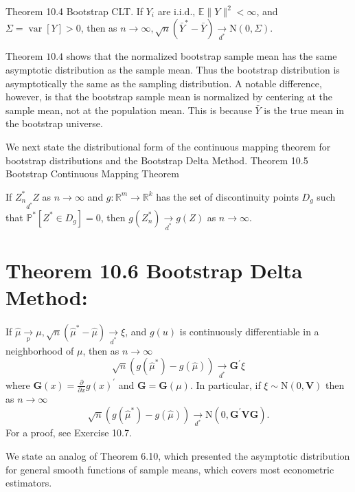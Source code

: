 \documentclass[10pt]{article}
\begin{document}
Theorem 10.4 Bootstrap CLT. If $Y_{i}$ are i.i.d., $\mathbb{E}\|Y\|^{2}<\infty$, and $\Sigma=\operatorname{var}[Y]>0$, then as $n \rightarrow \infty, \sqrt{n}\left(\bar{Y}^{*}-\bar{Y}\right) \underset{d^{*}}{\longrightarrow} \mathrm{N}(0, \Sigma)$.

Theorem $10.4$ shows that the normalized bootstrap sample mean has the same asymptotic distribution as the sample mean. Thus the bootstrap distribution is asymptotically the same as the sampling distribution. A notable difference, however, is that the bootstrap sample mean is normalized by centering at the sample mean, not at the population mean. This is because $\bar{Y}$ is the true mean in the bootstrap universe.

We next state the distributional form of the continuous mapping theorem for bootstrap distributions and the Bootstrap Delta Method. Theorem 10.5 Bootstrap Continuous Mapping Theorem

If $Z_{n}^{*} \underset{d^{*}}{ } Z$ as $n \rightarrow \infty$ and $g: \mathbb{R}^{m} \rightarrow \mathbb{R}^{k}$ has the set of discontinuity points $D_{g}$ such that $\mathbb{P}^{*}\left[Z^{*} \in D_{g}\right]=0$, then $g\left(Z_{n}^{*}\right) \underset{d^{*}}{\rightarrow} g(Z)$ as $n \rightarrow \infty$.

\section{Theorem 10.6 Bootstrap Delta Method:}
If $\widehat{\mu} \underset{p}{\longrightarrow} \mu, \sqrt{n}\left(\widehat{\mu}^{*}-\widehat{\mu}\right) \underset{d^{*}}{\longrightarrow} \xi$, and $g(u)$ is continuously differentiable in a neighborhood of $\mu$, then as $n \rightarrow \infty$
$$
\sqrt{n}\left(g\left(\widehat{\mu}^{*}\right)-g(\widehat{\mu})\right) \underset{d^{*}}{\longrightarrow} \boldsymbol{G}^{\prime} \xi
$$
where $\boldsymbol{G}(x)=\frac{\partial}{\partial x} g(x)^{\prime}$ and $\boldsymbol{G}=\boldsymbol{G}(\mu)$. In particular, if $\xi \sim \mathrm{N}(0, \boldsymbol{V})$ then as $n \rightarrow \infty$
$$
\sqrt{n}\left(g\left(\widehat{\mu}^{*}\right)-g(\widehat{\mu})\right) \underset{d^{*}}{\longrightarrow} \mathrm{N}\left(0, \boldsymbol{G}^{\prime} \boldsymbol{V} \boldsymbol{G}\right) .
$$
For a proof, see Exercise 10.7.

We state an analog of Theorem 6.10, which presented the asymptotic distribution for general smooth functions of sample means, which covers most econometric estimators.
\end{document}
